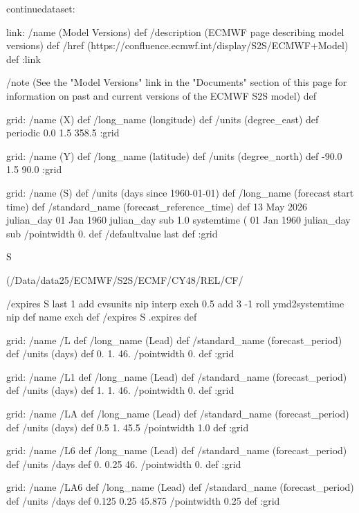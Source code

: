 \begin{ingrid}
continuedataset:

link:
 /name (Model Versions) def
 /description (ECMWF page describing model versions) def
 /href (https://confluence.ecmwf.int/display/S2S/ECMWF+Model) def
:link

/note (See the "Model Versions" link in the "Documents" section of this page for information on past and current versions of the ECMWF S2S model) def

grid:
/name (X) def
/long_name (longitude) def
/units (degree_east) def
periodic
0.0 1.5 358.5
:grid

grid:
/name (Y) def
/long_name (latitude) def
/units (degree_north) def
-90.0 1.5 90.0
:grid


grid:
/name (S) def
/units (days since 1960-01-01) def
/long_name (forecast start time) def
/standard_name (forecast_reference_time) def
13 May 2026 julian_day 01 Jan 1960 julian_day sub
1.0
systemtime
(%
01 Jan 1960 julian_day sub
/pointwidth 0. def
/defaultvalue { last } def
:grid


S {(/Data/data25/ECMWF/S2S/ECMF/CY48/REL/CF/%

/expires
  S last
    1 add
    cvsunits nip interp exch
      0.5 add
      3 -1 roll
      ymd2systemtime
    nip
def
name exch def
/expires S  .expires def


grid:
/name /L def
/long_name (Lead) def
/standard_name (forecast_period) def
/units (days) def
0. 1. 46.
/pointwidth 0. def
:grid

grid:
/name /L1 def
/long_name (Lead) def
/standard_name (forecast_period) def
/units (days) def
1. 1. 46.
/pointwidth 0. def
:grid

grid:
/name /LA def
/long_name (Lead) def
/standard_name (forecast_period) def
/units (days) def
0.5 1. 45.5
/pointwidth 1.0 def
:grid

grid:
/name /L6 def
/long_name (Lead) def
/standard_name (forecast_period) def
/units /days def
0. 0.25 46.
/pointwidth 0. def
:grid

grid:
/name /LA6 def
/long_name (Lead) def
/standard_name (forecast_period) def
/units /days def
0.125 0.25 45.875
/pointwidth 0.25 def
:grid

}
\end{ingrid}
